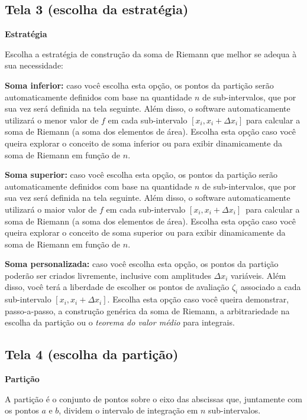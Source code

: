 \documentclass[a4paper,10pt]{scrartcl}
\newcommand\subintervalo{\ensuremath{[x_i, x_i + \Delta x_i]}}
\begin{document}
  \subsection*{Tela 3 (escolha da estratégia)}
    \textbf{Estratégia}

    Escolha a estratégia de construção da soma de Riemann que melhor se adequa à sua necessidade:
    \begin{compactdesc}
    \item{\textbf{Soma inferior:}} caso você escolha esta opção, os pontos da partição serão automaticamente definidos
    com base na quantidade $n$ de sub-intervalos, que por sua vez será definida na tela seguinte.
    Além disso, o software automaticamente utilizará o menor valor de $f$ em cada sub-intervalo $[x_i,x_i+\Delta x_i]$ para calcular a soma de Riemann
    (a soma dos elementos de área). Escolha esta opção caso você queira explorar o conceito de soma inferior ou para exibir dinamicamente da soma de Riemann
    em função de $n$.    
    \item{\textbf{Soma superior:}} caso você escolha esta opção, os pontos da partição serão automaticamente definidos com base na quantidade $n$ de sub-intervalos, que por sua vez será definida na tela seguinte. Além disso, o software automaticamente utilizará o maior valor de $f$ em cada sub-intervalo \subintervalo\ para calcular a soma de Riemann (a soma dos elementos de área). Escolha esta opção caso você queira explorar o conceito de soma superior ou para exibir dinamicamente da soma de Riemann em função de $n$.  
    \item{\textbf{Soma personalizada:}} caso você escolha esta opção, os pontos da partição poderão ser criados livremente, inclusive com amplitudes $\Delta x_i$ variáveis. Além disso, você terá a liberdade de escolher os pontos de avaliação $\zeta_i$ associado a cada sub-intervalo \subintervalo. Escolha esta opção caso você queira demonstrar, passo-a-passo, a construção genérica da soma de Riemann, a arbitrariedade na escolha da partição ou o \emph{teorema do valor médio} para integrais.
    \end{compactdesc}
    
  \newpage

  \subsection*{Tela 4 (escolha da partição)}
    \textbf{Partição}
    
    A partição é o conjunto de pontos sobre o eixo das abscissas que, juntamente com os pontos $a$ e $b$, dividem o intervalo de integração em $n$ sub-intervalos.
    
\end{document}
